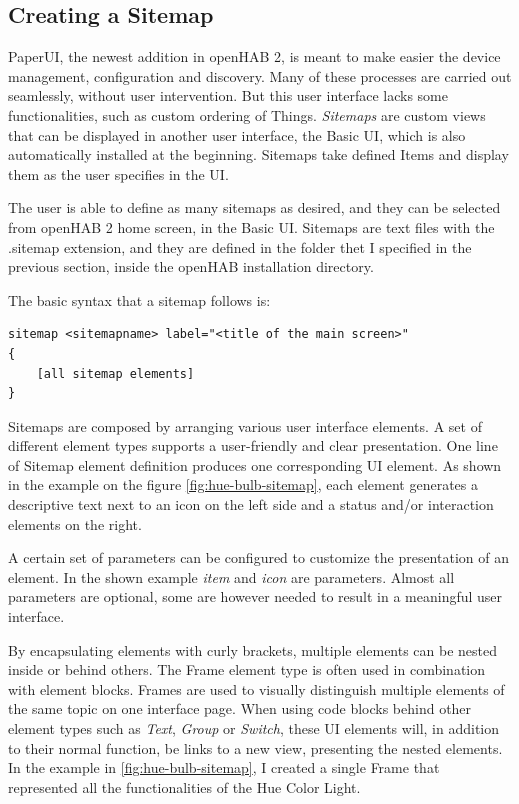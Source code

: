 \subsection{Creating a Sitemap}
PaperUI, the newest addition in openHAB 2, is meant to make easier the device management, configuration and discovery. Many of
these processes are carried out seamlessly, without user intervention. But this user interface lacks some functionalities, such as
custom ordering of Things. \textit{Sitemaps} are custom views that can be displayed in another user interface, the Basic UI, which
is also automatically installed at the beginning.\cite{openHABDocs} Sitemaps take defined Items and display them as the user specifies
in the UI.

The user is able to define as many sitemaps as desired, and they can be selected from openHAB 2 home screen, in the Basic UI. Sitemaps
are text files with the .sitemap extension, and they are defined in the folder thet I specified in the previous section, inside the openHAB
installation directory.

The basic syntax that a sitemap follows is:

\begin{lstlisting}[style=Consola]
sitemap <sitemapname> label="<title of the main screen>"
{
    [all sitemap elements]
}
\end{lstlisting}

Sitemaps are composed by arranging various user interface elements. A set of different element types supports a user-friendly and
clear presentation. One line of Sitemap element definition produces one corresponding UI element. As shown in the example on the
figure \ref{fig:hue-bulb-sitemap}, each element generates a descriptive text next to an icon on the left side and a status and/or
interaction elements on the right.

A certain set of parameters can be configured to customize the presentation of an element. In the shown example \textit{item} and
\textit{icon} are parameters. Almost all parameters are optional, some are however needed to result in a meaningful user interface.

By encapsulating elements with curly brackets, multiple elements can be nested inside or behind others. The Frame element type is
often used in combination with element blocks. Frames are used to visually distinguish multiple elements of the same topic on one
interface page. When using code blocks behind other element types such as \textit{Text}, \textit{Group} or \textit{Switch}, these UI
elements will, in addition to their normal function, be links to a new view, presenting the nested elements. In the example in
\ref{fig:hue-bulb-sitemap}, I created a single Frame that represented all the functionalities of the Hue Color Light.

